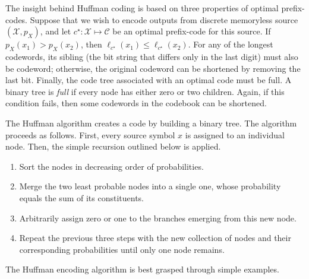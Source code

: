 The insight behind Huffman coding is based on three properties of optimal prefix-codes.
Suppose that we wish to encode outputs from discrete memoryless source $(\mathcal{X}, p_X)$, and let $c^{\star} : \mathcal{X} \mapsto \mathcal{C}$ be an optimal prefix-code for this source.
If $p_X(x_1) > p_X(x_2)$, then $\ell_{c^{\star}}(x_1) \leq \ell_{c^{\star}}(x_2)$.
For any of the longest codewords, its sibling (the bit string that differs only in the last digit) must also be codeword; otherwise, the original codeword can be shortened by removing the last bit.
Finally, the code tree associated with an optimal code must be full.
A binary tree is \emph{full} if every node has either zero or two children.
Again, if this condition fails, then some codewords in the codebook can be shortened.

The Huffman algorithm creates a code by building a binary tree.
The algorithm proceeds as follows.
First, every source symbol $x$ is assigned to an individual node.
Then, the simple recursion outlined below is applied.
\begin{enumerate}
\item Sort the nodes in decreasing order of probabilities.
\item Merge the two least probable nodes into a single one, whose probability equals the sum of its constituents.
\item Arbitrarily assign zero or one to the branches emerging from this new node.
\item Repeat the previous three steps with the new collection of nodes and their corresponding probabilities until only one node remains.
\end{enumerate}
The Huffman encoding algorithm is best grasped through simple examples.

